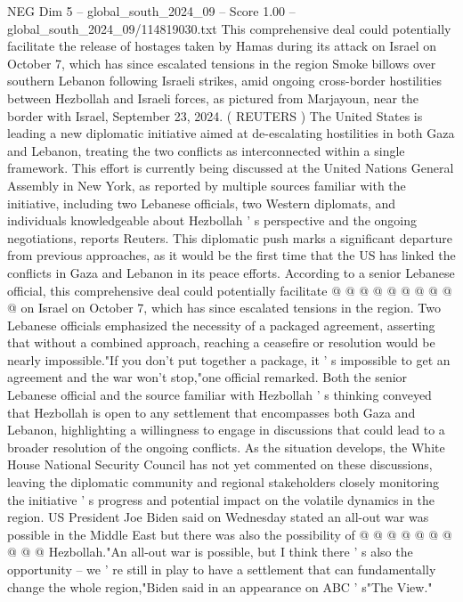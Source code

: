\begin{textsample}{NEG Dim 5 – global\_south\_2024\_09 – Score 1.00 – global\_south\_2024\_09/114819030.txt}  \label{ex:f5_neg_227}
This comprehensive deal could potentially facilitate the release of hostages taken by Hamas during its attack on Israel on October 7, which has since escalated tensions in the region Smoke billows over southern Lebanon following Israeli strikes, amid ongoing cross-border hostilities between Hezbollah and Israeli forces, as pictured from Marjayoun, near the border with Israel, September 23, 2024. ( REUTERS ) The United States is leading a new diplomatic initiative aimed at de-escalating hostilities in both Gaza and Lebanon, treating the two conflicts as interconnected within a single framework.
This effort is currently being discussed at the United Nations General Assembly in New York, as reported by multiple sources familiar with the initiative, including two Lebanese officials, two Western diplomats, and individuals knowledgeable about Hezbollah ' s perspective and the ongoing negotiations, reports Reuters.
This diplomatic push marks a significant departure from previous approaches, as it would be the first time that the US has linked the conflicts in Gaza and Lebanon in its peace efforts.
According to a senior Lebanese official, this comprehensive deal could potentially facilitate @ @ @ @ @ @ @ @ @ @ on Israel on October 7, which has since escalated tensions in the region.
Two Lebanese officials emphasized the necessity of a packaged agreement, asserting that without a combined approach, reaching a ceasefire or resolution would be nearly impossible."If you don't put together a package, it ' s impossible to get an agreement and the war won't stop,"one official remarked.
Both the senior Lebanese official and the source familiar with Hezbollah ' s thinking conveyed that Hezbollah is open to any settlement that encompasses both Gaza and Lebanon, highlighting a willingness to engage in discussions that could lead to a broader resolution of the ongoing conflicts.
As the situation develops, the White House National Security Council has not yet commented on these discussions, leaving the diplomatic community and regional stakeholders closely monitoring the initiative ' s progress and potential impact on the volatile dynamics in the region.
US President Joe Biden said on Wednesday stated an all-out war was possible in the Middle East but there was also the possibility of @ @ @ @ @ @ @ @ @ @ Hezbollah."An all-out war is possible, but I think there ' s also the opportunity -- we ' re still in play to have a settlement that can fundamentally change the whole region,"Biden said in an appearance on ABC ' s"The View."

\end{textsample}
